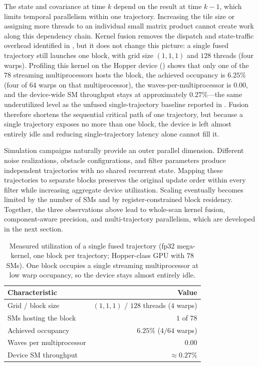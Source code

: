 \documentclass[research]{fcs}
\begin{document}
The state and covariance at time $k$ depend on the result at time $k-1$, which limits temporal parallelism within one trajectory. Increasing the tile size or assigning more threads to an individual small matrix product cannot create work along this dependency chain. Kernel fusion removes the dispatch and state-traffic overhead identified in , but it does not change this picture: a single fused trajectory still launches one block, with grid size $(1,1,1)$ and $128$ threads (four warps). Profiling this kernel on the Hopper device () shows that only one of the $78$ streaming multiprocessors hosts the block, the achieved occupancy is $6.25\%$ (four of $64$ warps on that multiprocessor), the waves-per-multiprocessor is $0.00$, and the device-wide SM throughput stays at approximately $0.27\%$---the same underutilized level as the unfused single-trajectory baseline reported in . Fusion therefore shortens the sequential critical path of one trajectory, but because a single trajectory exposes no more than one block, the device is left almost entirely idle and reducing single-trajectory latency alone cannot fill it.

Simulation campaigns naturally provide an outer parallel dimension. Different noise realizations, obstacle configurations, and filter parameters produce independent trajectories with no shared recurrent state. Mapping these trajectories to separate blocks preserves the original update order within every filter while increasing aggregate device utilization. Scaling eventually becomes limited by the number of SMs and by register-constrained block residency. Together, the three observations above lead to whole-scan kernel fusion, component-aware precision, and multi-trajectory parallelism, which are developed in the next section.

\begin{table}[H]
  \centering
  \caption{Measured utilization of a single fused trajectory (fp32 mega-kernel, one block per trajectory; Hopper-class GPU with $78$ SMs). One block occupies a single streaming multiprocessor at low warp occupancy, so the device stays almost entirely idle.}
  \label{tab:motivation-utilization}
  \begin{tabular}{@{}lr@{}}
    \toprule
    Characteristic & Value \\
    \midrule
    Grid / block size & $(1,1,1)$ / $128$ threads ($4$ warps) \\
    SMs hosting the block & $1$ of $78$ \\
    Achieved occupancy & $6.25\%$ ($4 / 64$ warps) \\
    Waves per multiprocessor & $0.00$ \\
    Device SM throughput & $\approx 0.27\%$ \\
    \bottomrule
  \end{tabular}
\end{table}
\end{document}
